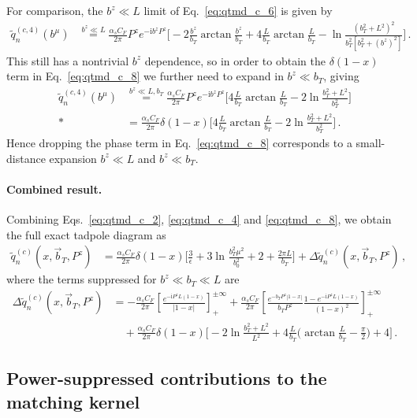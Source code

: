 \documentclass[11pt,a4paper]{article}
\DeclareRobustCommand{\eq}[1]{Eq.~\eqref{eq:#1}}
\newcommand{\img}{\mathrm{i}}
\newcommand{\eps}{\epsilon}
\newcommand{\nn}{\nonumber}
\newcommand{\as}{\alpha_s}
\newcommand{\Lb}[1]{\ln^{#1}\frac{b_T^2 \mu^2}{b_0^2}}
\newcommand{\bt}{\vec b_T}
\newcommand{\plusinf}{_+^{\pm\infty}}
\begin{document}
For comparison, the $b^z \ll L$ limit of \eq{qtmd_c_6} is given by
\begin{align} \label{eq:qtmd_c_9}
 \tilde q_n^{(c,4)}(b^\mu) &
 \stackrel{b^z \ll L}{=} \frac{\as C_F}{2\pi} P^z e^{-\img b^z P^z}
   \biggl[ - 2\frac{b^z}{b_T} \arctan\frac{b^z}{b_T}
   + 4 \frac{L}{b_T} \arctan\frac{L}{b_T}
   - \ln\frac{(b_T^2 + L^2)^2}{b_T^2 [b_T^2 + (b^z)^2]}
   \biggr]
\,.\end{align}
This still has a nontrivial $b^z$ dependence, so in order to obtain the $\delta(1-x)$
term in \eq{qtmd_c_8} we further need to expand in $b^z \ll b_T$, giving
\begin{align} \label{eq:qtmd_c_10}
 \tilde q_n^{(c,4)}(b^\mu) &
 \stackrel{b^z \ll L, b_T}{=}
 \frac{\as C_F}{2\pi} P^z e^{-\img b^z P^z}
   \biggl[ 4 \frac{L}{b_T} \arctan\frac{L}{b_T} - 2 \ln\frac{b_T^2 + L^2}{b_T^2} \biggr]
\nn\\*&
 = \frac{\as C_F}{2\pi} \delta(1-x) \biggl[ 4 \frac{L}{b_T} \arctan\frac{L}{b_T} - 2\ln\frac{b_T^2 + L^2}{b_T^2} \biggr]
\,.\end{align}
Hence dropping the phase term in \eq{qtmd_c_8} corresponds to a small-distance expansion
$b^z \ll L$ and $b^z \ll b_T$.

\paragraph{Combined result.}
Combining Eqs.\ \eqref{eq:qtmd_c_2}, \eqref{eq:qtmd_c_4} and \eqref{eq:qtmd_c_8},
we obtain the full exact tadpole diagram as
\begin{align} \label{eq:qtmd_c}
 \tilde q_n^{(c)}(x, \bt, P^z) &= \frac{\as C_F}{2\pi} \delta(1-x) \biggl[
   \frac{3}{\eps} + 3 \Lb{}  + 2 + \frac{2\pi L}{b_T} \biggr]
 + \Delta\tilde q_n^{(c)}(x, \bt, P^z)
\,,\end{align}
where the terms suppressed for $b^z \ll b_T \ll L$ are
\begin{align} \label{eq:qtmd_c_suppressed}
 \Delta\tilde q_n^{(c)}(x, \bt, P^z) &=
 -\frac{\as C_F}{2\pi} \left[\frac{e^{-\img P^z L (1-x)}}{|1-x|} \right]\plusinf
 + \frac{\as C_F}{2\pi} \left[ \frac{e^{-b_T P^z |1-x|}}{b_T P^z}
   \frac{1 - e^{- \img P^z L (1-x)}}{(1-x)^2} \right]\plusinf
 \nn\\&\quad
 + \frac{\as C_F}{2\pi} \delta(1-x) \biggl[- 2 \ln\frac{b_T^2 + L^2}{L^2}
   + 4 \frac{L}{b_T} \biggl(\arctan\frac{L}{b_T} - \frac{\pi}{2} \biggr) + 4\biggr]
\,.\end{align}

\subsection{Power-suppressed contributions to the matching kernel}
\label{app:pwr}
\end{document}

